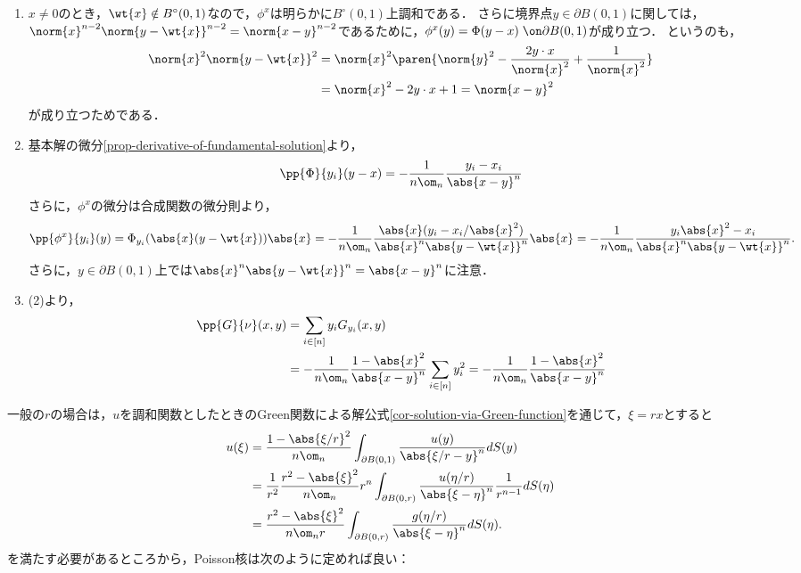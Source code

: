 \documentclass[uplatex,dvipdfmx]{jsreport}
\begin{document}
\begin{Proof}\mbox{}
    \begin{enumerate}
        \item $x\ne0$のとき，$\wt{x}\notin B^\circ(0,1)$なので，$\phi^x$は明らかに$B^\circ(0,1)$上調和である．
        さらに境界点$y\in\partial B(0,1)$に関しては，$\norm{x}^{n-2}\norm{y-\wt{x}}^{n-2}=\norm{x-y}^{n-2}$であるために，$\phi^x(y)=\Phi(y-x)\;\on \partial B(0,1)$が成り立つ．
        というのも，
        \begin{align*}
            \norm{x}^2\norm{y-\wt{x}}^2&=\norm{x}^2\paren{\norm{y}^2-\frac{2y\cdot x}{\norm{x}^2}+\frac{1}{\norm{x}^2}}\\
            &=\norm{x}^2-2y\cdot x+1=\norm{x-y}^2
        \end{align*}
        が成り立つためである．
        \item 基本解の微分\ref{prop-derivative-of-fundamental-solution}より，
        \[\pp{\Phi}{y_i}(y-x)=-\frac{1}{n\om_n}\frac{y_i-x_i}{\abs{x-y}^n}\]
        さらに，$\phi^x$の微分は合成関数の微分則より，
        \[\pp{\phi^x}{y_i}(y)=\Phi_{y_i}(\abs{x}(y-\wt{x}))\abs{x}=-\frac{1}{n\om_n}\frac{\abs{x}(y_i-x_i/\abs{x}^2)}{\abs{x}^n\abs{y-\wt{x}}^n}\abs{x}=-\frac{1}{n\om_n}\frac{y_i\abs{x}^2-x_i}{\abs{x}^n\abs{y-\wt{x}}^n}.\]
        さらに，$y\in\partial B(0,1)$上では$\abs{x}^n\abs{y-\wt{x}}^n=\abs{x-y}^n$に注意．
        \item (2)より，
        \begin{align*}
            \pp{G}{\nu}(x,y)&=\sum_{i\in[n]}y_iG_{y_i}(x,y)\\
            &=-\frac{1}{n\om_n}\frac{1-\abs{x}^2}{\abs{x-y}^n}\sum_{i\in[n]}y_i^2=-\frac{1}{n\om_n}\frac{1-\abs{x}^2}{\abs{x-y}^n}
        \end{align*}
    \end{enumerate}
\end{Proof}
\begin{remark}
    一般の$r$の場合は，$u$を調和関数としたときのGreen関数による解公式\ref{cor-solution-via-Green-function}を通じて，$\xi=rx$とすると
    \begin{align*}
        u(\xi)&=\frac{1-\abs{\xi/r}^2}{n\om_n}\int_{\partial B(0,1)}\frac{u(y)}{\abs{\xi/r-y}^n}dS(y)\\
        &=\frac{1}{r^2}\frac{r^2-\abs{\xi}^2}{n\om_n}r^n\int_{\partial B(0,r)}\frac{u(\eta/r)}{\abs{\xi-\eta}^n}\frac{1}{r^{n-1}}dS(\eta)\\
        &=\frac{r^2-\abs{\xi}^2}{n\om_nr}\int_{\partial B(0,r)}\frac{g(\eta/r)}{\abs{\xi-\eta}^n}dS(\eta).
    \end{align*}
    を満たす必要があるところから，Poisson核は次のように定めれば良い：
\end{remark}
\end{document}
